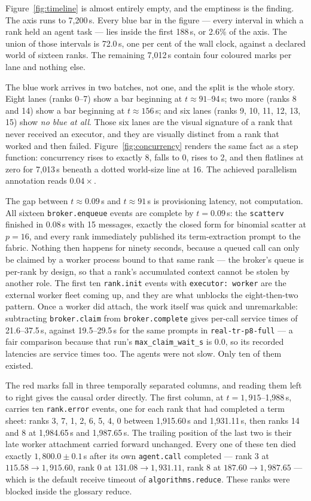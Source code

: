 \documentclass[11pt]{article}
\begin{document}
Figure~\ref{fig:timeline} is almost entirely empty, and the emptiness is the finding. The
axis runs to 7{,}200\,s. Every blue bar in the figure --- every interval in which a rank
held an agent task --- lies inside the first 188\,s, or 2.6\% of the axis. The union of
those intervals is 72.0\,s, one per cent of the wall clock, against a declared world of
sixteen ranks. The remaining 7{,}012\,s contain four coloured marks per lane and nothing
else.

The blue work arrives in two batches, not one, and the split is the whole story. Eight
lanes (ranks 0--7) show a bar beginning at $t \approx 91$--94\,s; two more (ranks 8 and
14) show a bar beginning at $t \approx 156$\,s; and six lanes (ranks 9, 10, 11, 12, 13,
15) show \emph{no blue at all}. Those six lanes are the visual signature of a rank that
never received an executor, and they are visually distinct from a rank that worked and
then failed. Figure~\ref{fig:concurrency} renders the same fact as a step function:
concurrency rises to exactly 8, falls to 0, rises to 2, and then flatlines at zero for
7{,}013\,s beneath a dotted world-size line at 16. The achieved parallelism annotation
reads $0.04\times$.

The gap between $t\approx0.09$\,s and $t\approx91$\,s is provisioning latency, not
computation. All sixteen \texttt{broker.enqueue} events are complete by $t=0.09$\,s: the
\texttt{scatterv} finished in 0.08\,s with 15 messages, exactly the closed form for
binomial scatter at $p=16$, and every rank immediately published its term-extraction
prompt to the fabric. Nothing then happens for ninety seconds, because a queued call can
only be claimed by a worker process bound to that same rank --- the broker's queue is
per-rank by design, so that a rank's accumulated context cannot be stolen by another
role. The first ten \texttt{rank.init} events with \texttt{executor: worker} are the
external worker fleet coming up, and they are what unblocks the eight-then-two pattern.
Once a worker did attach, the work itself was quick and unremarkable: subtracting
\texttt{broker.claim} from \texttt{broker.complete} gives per-call service times of
21.6--37.5\,s, against 19.5--29.5\,s for the same prompts in \texttt{real-tr-p8-full} ---
a fair comparison because that run's \texttt{max\_claim\_wait\_s} is 0.0, so its recorded
latencies are service times too. The agents were not slow. Only ten of them existed.

The red marks fall in three temporally separated columns, and reading them left to right
gives the causal order directly. The first column, at $t = 1{,}915$--1{,}988\,s, carries
ten \texttt{rank.error} events, one for each rank that had completed a term sheet: ranks
3, 7, 1, 2, 6, 5, 4, 0 between 1{,}915.60\,s and 1{,}931.11\,s, then ranks 14 and 8 at
1{,}984.65\,s and 1{,}987.65\,s. The trailing position of the last two is their late
worker attachment carried forward unchanged. Every one of these ten died exactly
$1{,}800.0 \pm 0.1$\,s after its own \texttt{agent.call} completed --- rank 3 at
$115.58 \to 1{,}915.60$, rank 0 at $131.08 \to 1{,}931.11$, rank 8 at $187.60 \to
1{,}987.65$ --- which is the default receive timeout of
\texttt{algorithms.reduce}. These ranks were blocked inside the glossary reduce.
\end{document}
